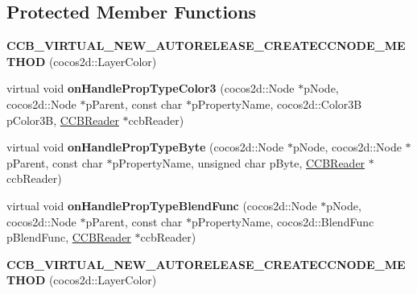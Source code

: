 \subsection*{Protected Member Functions}
\begin{DoxyCompactItemize}
\item 
\mbox{\label{classcocosbuilder_1_1LayerColorLoader_a315d13cf0161a53e1b2e6c5a3249ab9f}} 
{\bfseries C\+C\+B\+\_\+\+V\+I\+R\+T\+U\+A\+L\+\_\+\+N\+E\+W\+\_\+\+A\+U\+T\+O\+R\+E\+L\+E\+A\+S\+E\+\_\+\+C\+R\+E\+A\+T\+E\+C\+C\+N\+O\+D\+E\+\_\+\+M\+E\+T\+H\+OD} (cocos2d\+::\+Layer\+Color)
\item 
\mbox{\label{classcocosbuilder_1_1LayerColorLoader_a60333fe128ac24804f2de7fae4abb1da}} 
virtual void {\bfseries on\+Handle\+Prop\+Type\+Color3} (cocos2d\+::\+Node $\ast$p\+Node, cocos2d\+::\+Node $\ast$p\+Parent, const char $\ast$p\+Property\+Name, cocos2d\+::\+Color3B p\+Color3B, \hyperlink{classcocosbuilder_1_1CCBReader}{C\+C\+B\+Reader} $\ast$ccb\+Reader)
\item 
\mbox{\label{classcocosbuilder_1_1LayerColorLoader_ad1b9d9ed6cdd9148d1ca1e950694613f}} 
virtual void {\bfseries on\+Handle\+Prop\+Type\+Byte} (cocos2d\+::\+Node $\ast$p\+Node, cocos2d\+::\+Node $\ast$p\+Parent, const char $\ast$p\+Property\+Name, unsigned char p\+Byte, \hyperlink{classcocosbuilder_1_1CCBReader}{C\+C\+B\+Reader} $\ast$ccb\+Reader)
\item 
\mbox{\label{classcocosbuilder_1_1LayerColorLoader_ad03fd95af2e8756ba12d0fade5edadaa}} 
virtual void {\bfseries on\+Handle\+Prop\+Type\+Blend\+Func} (cocos2d\+::\+Node $\ast$p\+Node, cocos2d\+::\+Node $\ast$p\+Parent, const char $\ast$p\+Property\+Name, cocos2d\+::\+Blend\+Func p\+Blend\+Func, \hyperlink{classcocosbuilder_1_1CCBReader}{C\+C\+B\+Reader} $\ast$ccb\+Reader)
\item 
\mbox{\label{classcocosbuilder_1_1LayerColorLoader_a315d13cf0161a53e1b2e6c5a3249ab9f}} 
{\bfseries C\+C\+B\+\_\+\+V\+I\+R\+T\+U\+A\+L\+\_\+\+N\+E\+W\+\_\+\+A\+U\+T\+O\+R\+E\+L\+E\+A\+S\+E\+\_\+\+C\+R\+E\+A\+T\+E\+C\+C\+N\+O\+D\+E\+\_\+\+M\+E\+T\+H\+OD} (cocos2d\+::\+Layer\+Color)
\item 

\end{DoxyCompactItemize}

